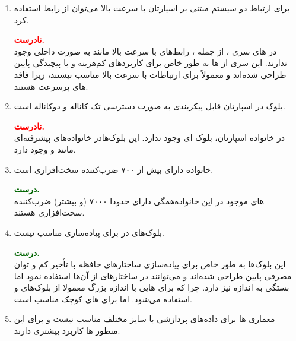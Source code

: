 \begin{enumerate}
	\item 
	برای ارتباط دو سیستم مبتنی بر اسپارتان  با سرعت بالا می‌توان از رابط  استفاده کرد.
	\begin{qsolve}
		\textbf{\textcolor{red}{نادرست.}}\\
		در  های سری ، از جمله ، رابط‌های با سرعت بالا مانند  به صورت داخلی وجود ندارند. این سری از  ها به طور خاص برای کاربردهای کم‌هزینه و با پیچیدگی پایین طراحی شده‌اند و معمولاً برای ارتباطات با سرعت بالا مناسب نیستند، زیرا فاقد  های پرسرعت هستند.
	\end{qsolve}
	
	
	
	
	\item 
بلوک  در اسپارتان قابل پیکربندی به صورت دسترسی تک کاناله و دوکاناله است.
	\begin{qsolve}
		\textbf{\textcolor{red}{نادرست.}}\\
		در خانواده اسپارتان، بلوک  ای وجود ندارد. این بلوک‌هادر خانواده‌های پیشرفته‌ای مانند  و  وجود دارد.
	\end{qsolve}
	
	
	
	
	\item 
خانواده  دارای بیش از ۷۰۰ ضرب‌کننده سخت‌افزاری است.
	\begin{qsolve}
		\textbf{\textcolor{darkgreen}{درست.}}\\
		\lr{FPGA}
		های موجود در این خانواده‌همگی دارای حدودا ۷۰۰۰ (و بیشتر) ضرب‌کننده سخت‌افزاری هستند.
	\end{qsolve}
	
	
	
	
	\item 
بلوک‌های  در  برای پیاده‌سازی  مناسب نیست.
	\begin{qsolve}
		\textbf{\textcolor{darkgreen}{درست.}}\\
	این بلوک‌ها به طور خاص برای پیاده‌سازی ساختارهای حافظه با تأخیر کم و توان مصرفی پایین طراحی شده‌اند و می‌توانند در ساختارهای  از آن‌ها استفاده نمود اما بستگی به اندازه  نیز دارد. چرا که برای هایی با اندازه بزرگ معمولا از بلوک‌های  و  استفاده می‌شود. اما برای  های کوچک مناسب است.
	\end{qsolve}
	
	
	\item 
معماری ها برای داده‌های پردازشی با سایز مختلف مناسب نیست و برای این منظور ها کاربرد بیشتری دارند.


\end{enumerate}
